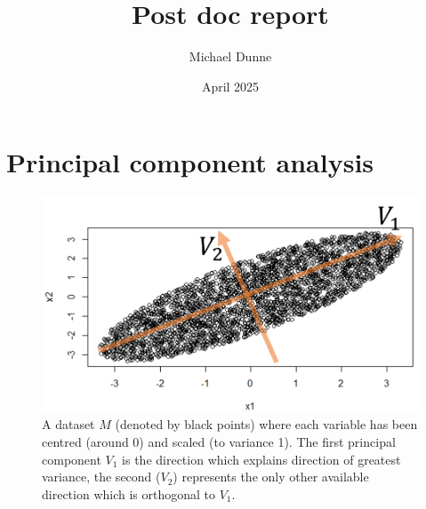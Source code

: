 \documentclass{article}
\title{Post doc report}
\author{Michael Dunne}
\date{April 2025}
\newcommand{\RSingVecs}{V}
\newcommand{\sampleMat}{M}
\begin{document}
\maketitle

\section{Principal component analysis}
\label{section:dim.red}
\begin{figure}
    \centering
    \includegraphics[width=\linewidth]{PCA_example.png}
    \caption{A dataset $\sampleMat$ (denoted by black points) where each variable has been centred (around 0) and scaled (to variance 1). The first principal component $\RSingVecs_1$ is the direction which explains direction of greatest variance, the second ($\RSingVecs_2$) represents the only other available direction which is orthogonal to $\RSingVecs_1$.}
    \label{fig:pca_example}
\end{figure}
\end{document}
